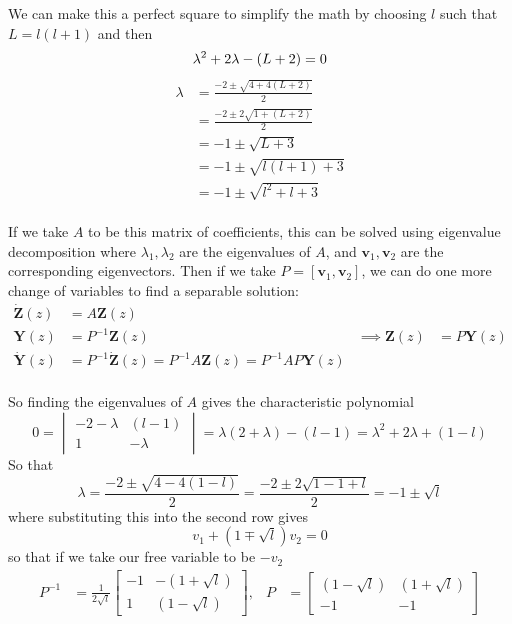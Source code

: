 \documentclass{article}	%
\theoremstyle{definition}
\begin{document}
We can make this a perfect square to simplify the math by choosing $l$ such that $L=l(l+1)$ and then
\[\lambda^{2} +2\lambda -(L+2) = 0\\\]
\begin{align*}
\lambda &= \frac{-2 \pm \sqrt{4 +4(L+2)}}{2}\\
&= \frac{-2 \pm 2\sqrt{1 +(L+2)}}{2}\\
&= -1 \pm \sqrt{L+3}\\
&= -1 \pm \sqrt{l(l+1)+3}\\
&= -1 \pm \sqrt{l^{2}+l+3}\\
\end{align*}


If we take $A$ to be this matrix of coefficients, this can be solved using eigenvalue decomposition where $\lambda_{1},\lambda_{2}$ are the eigenvalues of $A$, and $\mathbf{v}_{1},\mathbf{v}_{2}$ are the corresponding eigenvectors. Then if we take $P=[\mathbf{v}_{1},\mathbf{v}_{2}]$, we can do one more change of variables to find a separable solution:
\begin{align*}
\dot{\mathbf{Z}}(z) &= A \mathbf{Z}(z)\\
\mathbf{Y}(z) &= P^{-1}\mathbf{Z}(z)	& \implies	\mathbf{Z}(z) &= P\mathbf{Y}(z)\\
\dot{\mathbf{Y}}(z) &= P^{-1}\dot{\mathbf{Z}}(z) = P^{-1}A \mathbf{Z}(z) = P^{-1}AP \mathbf{Y}(z)
\end{align*}

\paragraph{}
So finding the eigenvalues of $A$ gives the characteristic polynomial
\[ 0 =
\begin{vmatrix}
-2-\lambda	&	(l-1)	\\
1			&	-\lambda
\end{vmatrix}
= \lambda(2+\lambda) - (l-1) = \lambda^{2} +2\lambda +(1-l)
\]
So that 
\[ \lambda = \frac{-2 \pm \sqrt{4-4(1-l)}}{2} = \frac{-2 \pm 2\sqrt{1-1+l}}{2} = -1 \pm \sqrt{l} \]
where substituting this into the second row gives
\[ v_{1} +(1\mp\sqrt{l})v_{2} = 0 \]
so that if we take our free variable to be $-v_{2}$
\begin{align*}
P^{-1} &= \frac{1}{2\sqrt{l}}
\begin{bmatrix}
-1	&	-(1+\sqrt{l})	\\
1	&	(1-\sqrt{l})
\end{bmatrix},
&
P &= 
\begin{bmatrix}
(1-\sqrt{l})	&	(1+\sqrt{l})	\\
-1				&	-1
\end{bmatrix}
\end{align*}
\end{document}
